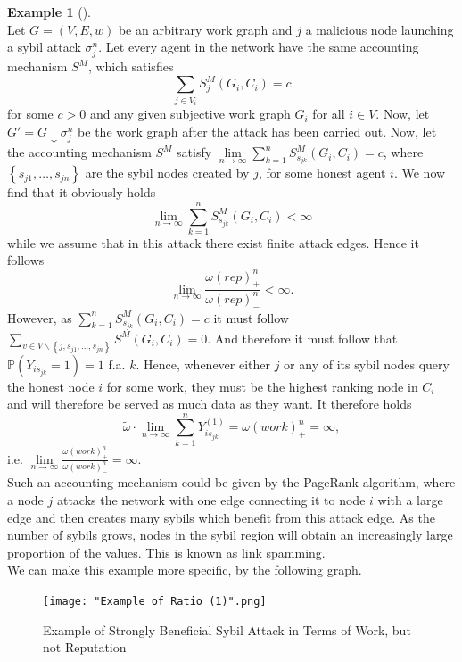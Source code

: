 \documentclass[11pt,a4paper]{article}
\theoremstyle{definition}
\theoremstyle{theorem}
\theoremstyle{proposition}
\theoremstyle{corollary}
\theoremstyle{lemma}
\theoremstyle{example}
\newtheorem{example}{Example}[section]
\theoremstyle{remark}
\begin{document}
\begin{example}[]\ \\
Let $G=(V,E,w)$ be an arbitrary work graph and $j$ a malicious node launching a sybil attack $\sigma^n_j$. Let every agent in the network have the same accounting mechanism $S^M$, which satisfies 
\[
\sum\limits_{j\in{}V_i}S^M_j(G_i,C_i)=c
\]
for some $c>0$ and any given subjective work graph $G_i$ for all $i\in{}V$. Now, let $G'=G\downarrow\sigma^n_j$ be the work graph after the attack has been carried out. Now, let the accounting mechanism $S^M$ satisfy $\lim\limits_{n\rightarrow\infty}\sum\limits_{k=1}^{n}S^M_{s_{jk}}(G_i,C_i)=c$, where $\left\lbrace{}s_{j1},\ldots,s_{jn}\right\rbrace$ are the sybil nodes created by $j$, for some honest agent $i$. We now find that it obviously holds
\[
\lim\limits_{n\rightarrow\infty}\sum\limits_{k=1}^{n}S^M_{s_{jk}}(G_i,C_i)<\infty
\]
while we assume that in this attack there exist finite attack edges. Hence it follows
\[
\lim\limits_{n\rightarrow\infty}\frac{\omega(rep)^n_{+}}{\omega(rep)^n_{-}}<\infty.
\]
However, as $\sum\limits_{k=1}^{n}S^M_{s_{jk}}(G_i,C_i)=c$ it must follow $\sum\limits_{v\in{}V\backslash{}\left\lbrace{}j,s_{j1},\ldots,s_{jn}\right\rbrace}S^M_{}(G_i,C_i)=0$. And therefore it must follow that $\mathbb{P}(Y_{is_{jk}}=1)=1$ f.a. $k$. Hence, whenever either $j$ or any of its sybil nodes query the honest node $i$ for some work, they must be the highest ranking node in $C_i$ and will therefore be served as much data as they want. It therefore holds
\[
\tilde{\omega}\cdot{}\lim\limits_{n\rightarrow\infty}\sum\limits_{k=1}^{n}Y^{(1)}_{is_{jk}} = \omega(work)^n_{+} = \infty,
\]
i.e. $\lim\limits_{n\rightarrow\infty}\frac{\omega(work)^n_{+}}{\omega(work)^n_{-}}=\infty$. 
\vspace{1em}\\

\noindent{}Such an accounting mechanism could be given by the PageRank algorithm, where a node $j$ attacks the network with one edge connecting it to node $i$ with a large edge and then creates many sybils which benefit from this attack edge. As the number of sybils grows, nodes in the sybil region will obtain an increasingly large proportion of the values. This is known as link spamming. \vspace{1em}\\

\noindent{}We can make this example more specific, by the following graph. 

\begin{figure}[H]
\begin{center}
\texttt{[image: "Example of Ratio (1)".png]}
\caption{Example of Strongly Beneficial Sybil Attack in Terms of Work, but not Reputation}
\label{fig:Example of Strongly Beneficial Sybil Attack in Terms of Work, but not Reputation}
\end{center}
\end{figure}


\end{example}
\end{document}

